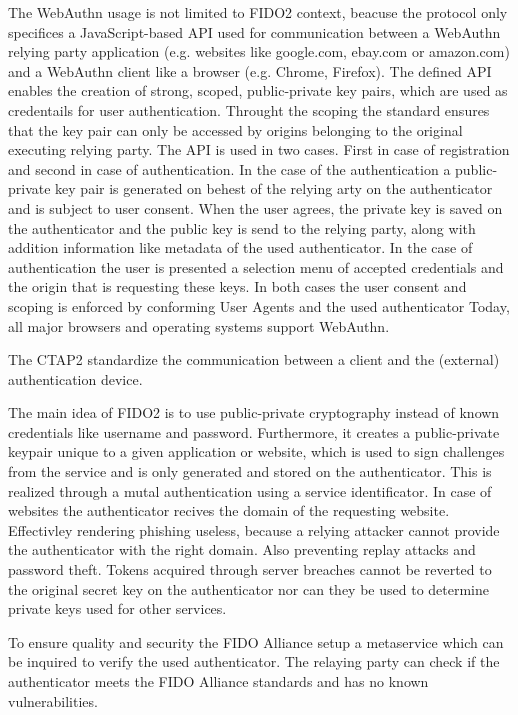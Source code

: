 \documentclass[runningheads]{llncs}
\begin{document}
The WebAuthn usage is not limited to FIDO2 context, beacuse the protocol only specifices a JavaScript-based API used for communication between a WebAuthn relying party application (e.g. websites like google.com, ebay.com or amazon.com) and a WebAuthn client like a browser (e.g. Chrome, Firefox). The defined API enables the creation of strong, scoped, public-private key pairs, which are used as credentails for user authentication. Throught the scoping the standard ensures that the key pair can only be accessed by origins belonging to the original executing relying party. The API is used in two cases. First in case of registration and second in case of authentication. In the case of the authentication a public-private key pair is generated on behest of the relying arty on the authenticator and is subject to user consent. When the user agrees, the private key is saved on the authenticator and the public key is send to the relying party, along with addition information like metadata of the used authenticator. In the case of authentication the user is presented a selection menu of accepted credentials and the origin that is requesting these keys. In both cases the user consent and scoping is enforced by conforming User Agents and the used authenticator\cite{000002} Today, all major browsers and operating systems support WebAuthn.\cite{000001}

The CTAP2 standardize the communication between a client and the (external) authentication device.\cite{274547}\cite{9099190}

The main idea of FIDO2 is to use public-private cryptography instead of known credentials like username and password. Furthermore, it creates a public-private keypair unique to a given application or website, which is used to sign challenges from the service and is only generated and stored on the authenticator. This is realized through a mutal authentication using a service identificator. In case of websites the authenticator recives the domain of the requesting website. Effectivley rendering phishing useless, because a relying attacker cannot provide the authenticator with the right domain.\cite{274610} Also preventing replay attacks and password theft. Tokens acquired through server breaches cannot be reverted to the original secret key on the authenticator nor can they be used to determine private keys used for other services.

To ensure quality and security the FIDO Alliance setup a metaservice which can be inquired to verify the used authenticator. The relaying party can check if the authenticator meets the FIDO Alliance standards and has no known vulnerabilities.\cite{9099190}
\end{document}
